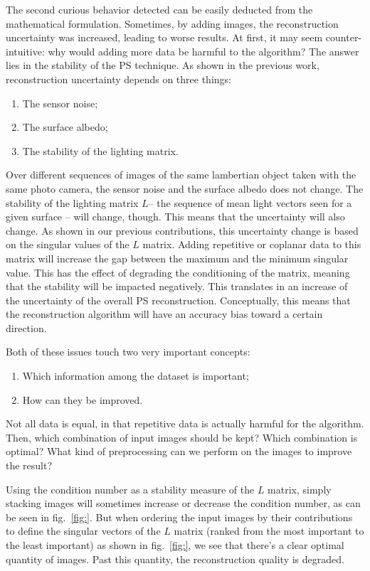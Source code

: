 \documentclass{report}
\begin{document}
The second curious behavior detected can be easily deducted from the mathematical formulation. Sometimes, by adding images, the reconstruction uncertainty was increased, leading to worse results. At first, it may seem counter-intuitive: why would adding more data be harmful to the algorithm? The answer lies in the stability of the PS technique. As shown in the previous work, reconstruction uncertainty depends on three things:
\begin{enumerate}
  \item The sensor noise;
  \item The surface albedo;
  \item The stability of the lighting matrix.
\end{enumerate}
Over different sequences of images of the same lambertian object taken with the same photo camera, the sensor noise and the surface albedo does not change. The stability of the lighting matrix $L$-- the sequence of mean light vectors seen for a given surface -- will change, though. This means that the uncertainty will also change. As shown in our previous contributions, this uncertainty change is based on the singular values of the $L$ matrix. Adding repetitive or coplanar data to this matrix will increase the gap between the maximum and the minimum singular value. This has the effect of degrading the conditioning of the matrix, meaning that the stability will be impacted negatively. This translates in an increase of the uncertainty of the overall PS reconstruction. Conceptually, this means that the reconstruction algorithm will have an accuracy bias toward a certain direction.

Both of these issues touch two very important concepts:
\begin{enumerate}
\item Which information among the dataset is important;
\item How can they be improved.
\end{enumerate}
Not all data is equal, in that repetitive data is actually harmful for the algorithm. Then, which combination of input images should be kept? Which combination is optimal? What kind of preprocessing can we perform on the images to improve the result?

Using the condition number as a stability measure of the $L$ matrix, simply stacking images will sometimes increase or decrease the condition number, as can be seen in fig.~\ref{fig:}. But when ordering the input images by their contributions to define the singular vectors of the $L$ matrix (ranked from the most important to the least important) as shown in fig.~\ref{fig:}, we see that there's a clear optimal quantity of images. Past this quantity, the reconstruction quality is degraded.
\end{document}
